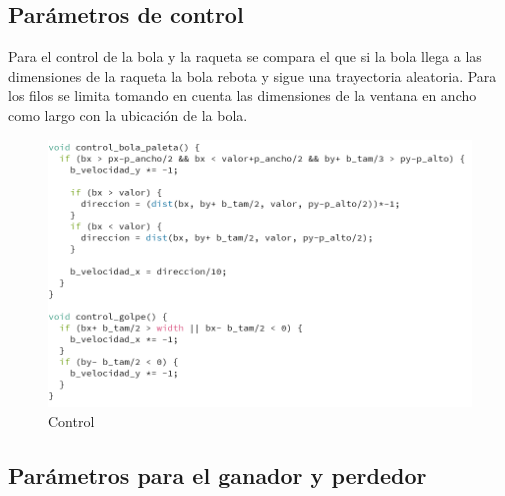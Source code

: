 \documentclass[10pt,a4paper]{article}
\begin{document}
\subsection{Parámetros de control}
Para el control de la bola y la raqueta se compara el que si la bola llega a las dimensiones de la raqueta la bola rebota y sigue una trayectoria aleatoria.
Para los filos se limita tomando en cuenta las dimensiones de la ventana en ancho como largo con la ubicación de la bola.
\begin{figure}[H]
\centering
\includegraphics[scale=0.6]{control.PNG}
\caption{Control}
\end{figure}


\subsection{Parámetros para el ganador y perdedor}
\end{document}
